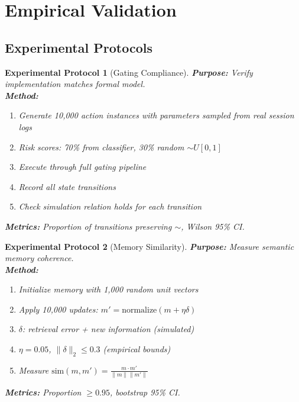 \documentclass[12pt]{article}
\newtheorem{experiment}{Experimental Protocol}[section]
\begin{document}
\section{Empirical Validation}

\subsection{Experimental Protocols}

\begin{experiment}[Gating Compliance]
\textbf{Purpose:} Verify implementation matches formal model.\\
\textbf{Method:}
\begin{enumerate}
    \item Generate 10,000 action instances with parameters sampled from real session logs
    \item Risk scores: 70\% from classifier, 30\% random $\sim U[0,1]$
    \item Execute through full gating pipeline
    \item Record all state transitions
    \item Check simulation relation holds for each transition
\end{enumerate}
\textbf{Metrics:} Proportion of transitions preserving $\sim$, Wilson 95\% CI.
\end{experiment}

\begin{experiment}[Memory Similarity]
\textbf{Purpose:} Measure semantic memory coherence.\\
\textbf{Method:}
\begin{enumerate}
    \item Initialize memory with 1,000 random unit vectors
    \item Apply 10,000 updates: $m' = \text{normalize}(m + \eta \delta)$
    \item $\delta$: retrieval error + new information (simulated)
    \item $\eta = 0.05$, $\|\delta\|_2 \leq 0.3$ (empirical bounds)
    \item Measure $\text{sim}(m, m') = \frac{m \cdot m'}{\|m\|\|m'\|}$
\end{enumerate}
\textbf{Metrics:} Proportion $\geq 0.95$, bootstrap 95\% CI.
\end{experiment}
\end{document}
